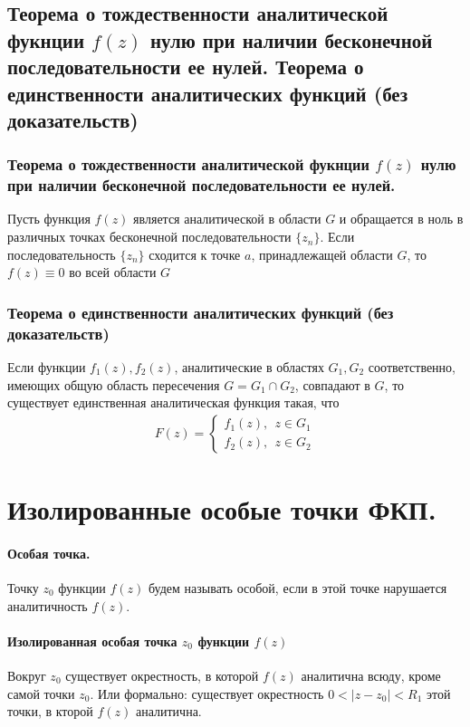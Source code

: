 \documentclass[12pt]{extarticle}
\begin{document}
\subsection{Теорема о тождественности аналитической фукнции $f(z)$ нулю
при наличии бесконечной последовательности ее нулей. Теорема о
единственности аналитических функций (без доказательств)}
\subsubsection{Теорема о тождественности аналитической фукнции $f(z)$ нулю
при наличии бесконечной последовательности ее нулей.}
Пусть функция $f(z)$ является аналитической в
области $G$ и обращается в ноль в различных точках бесконечной
последовательности $\{z_{n}\}$. Если последовательность $\{z_{n}\}$
сходится к точке $a$, принадлежащей области $G$, то $f(z)\equiv 0$ во
всей области $G$
\subsubsection{Теорема о единственности аналитических функций (без доказательств)}
Если функции $f_{1}(z),f_{2}(z)$, аналитические в областях $G_{1},G_{2}$
соответственно, имеющих общую область пересечения $G=G_{1}\cap G_{2}$,
совпадают в $G$, то существует единственная аналитическая функция такая,
что
\begin{eqnarray*}
    F(z)=\left\{\begin{aligned}
            f_{1}(z),\ \ z\in G_{1}\\
            f_{2}(z),\ \ z\in G_{2}
    \end{aligned} \right.
\end{eqnarray*}



\section{Изолированные особые точки ФКП.}
\paragraph{Особая точка.} Точку $z_{0}$ функции
$f(z)$ будем называть особой, если в этой точке нарушается аналитичность
$f(z)$.
\paragraph{Изолированная особая точка $z_{0}$ функции $f(z)$}
Вокруг $z_{0}$ существует окрестность, в которой $f(z)$ аналитична
всюду, кроме самой точки $z_{0}$. Или формально: существует окрестность
$0<|z-z_{0}|<R_{1}$ этой точки, в кторой $f(z)$ аналитична.
\end{document}
